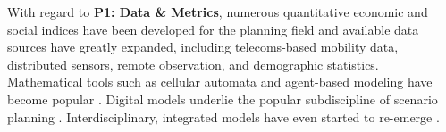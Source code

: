 With regard to \textbf{P1: Data \& Metrics}, numerous quantitative economic and social indices have been developed for the planning field \cite{boyceFrameworkDefiningApplying1972, cliftonQuantitativeAnalysisUrban2008,readAssetbasedEconomicDevelopment2012,sawickiNeighborhoodIndicatorsReview1996,valRegionalLocalEconomic1991} and available data sources have greatly expanded, including telecoms-based mobility data, distributed sensors, remote observation, and demographic statistics. Mathematical tools such as cellular automata and agent-based modeling have become popular \cite{battyCitiesComplexity2005,laufUncoveringLanduseDynamics2012}. Digital models underlie the popular subdiscipline of scenario planning \cite{goodspeedScenarioPlanningCities2020,zapataRadicalUncertaintyScenario2015}. Interdisciplinary, integrated models have even started to re-emerge \cite{millerIntegratedUrbanModeling2018,moeckelTrendsIntegratedLanduse2018,shahumyanIntegrationLandUse2017}. 


